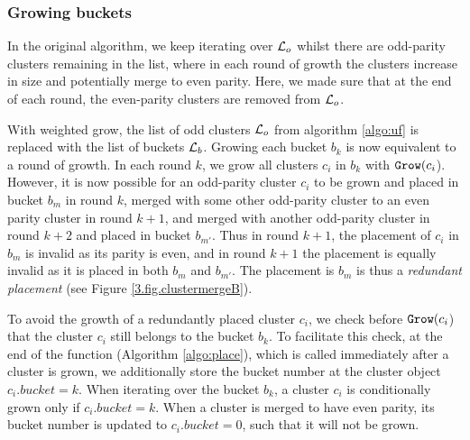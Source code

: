 

\subsubsection{Growing buckets}

In the original algorithm, we keep iterating over $\mathcal{L}_o$ whilst there are odd-parity clusters remaining in the list, where in each round of growth the clusters increase in size and potentially merge to even parity. Here, we made sure that at the end of each round, the even-parity clusters are removed from $\mathcal{L}_o$. 

With weighted grow, the list of odd clusters $\mathcal{L}_o$ from algorithm \ref{algo:uf} is replaced with the list of buckets $\mathcal{L}_b$. Growing each bucket $b_k$ is now equivalent to a round of growth. In each round $k$, we grow all clusters $c_i$ in $b_k$ with $\texttt{Grow}(c_i$). However, it is now possible for an odd-parity cluster $c_i$ to be grown and placed in bucket $b_m$ in round $k$, merged with some other odd-parity cluster to an even parity cluster in round $k+1$, and merged with another odd-parity cluster in round $k+2$ and placed in bucket $b_{m'}$. Thus in round $k+1$, the placement of $c_i$ in $b_m$ is invalid as its parity is even, and in round $k+1$ the placement is equally invalid as it is placed in both $b_m$ and $b_{m'}$. The placement is $b_m$ is thus a \emph{redundant placement} (see Figure \ref{3.fig.clustermergeB}).

To avoid the growth of a redundantly placed cluster $c_i$, we check before $\texttt{Grow}(c_i$) that the cluster $c_i$ still belongs to the bucket $b_k$. To facilitate this check, at the end of the function  (Algorithm \ref{algo:place}), which is called immediately after a cluster is grown, we additionally store the bucket number at the cluster object $c_i.bucket = k$. When iterating over the bucket $b_k$, a cluster $c_i$ is conditionally grown only if $c_i.bucket = k$. When a cluster is merged to have even parity, its bucket number is updated to $c_i.bucket=0$, such that it will not be grown.  

